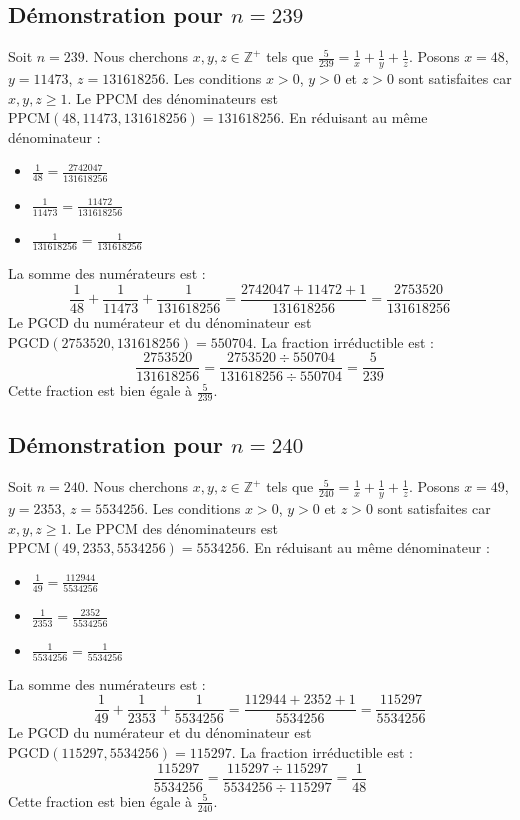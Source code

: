 \documentclass[11pt,a4paper]{article}
\begin{document}
\subsection{Démonstration pour $n = 239$}
Soit $n = 239$. Nous cherchons $x, y, z \in \mathbb{Z}^{+}$ tels que $\frac{5}{239} = \frac{1}{x} + \frac{1}{y} + \frac{1}{z}$.
Posons $x = 48$, $y = 11473$, $z = 131618256$.
Les conditions $x > 0$, $y > 0$ et $z > 0$ sont satisfaites car $x, y, z \geq 1$.
Le PPCM des dénominateurs est $\text{PPCM}(48, 11473, 131618256) = 131618256$.
En réduisant au même dénominateur :
\begin{itemize}
    \item $\frac{1}{48} = \frac{2742047}{131618256}$
    \item $\frac{1}{11473} = \frac{11472}{131618256}$
    \item $\frac{1}{131618256} = \frac{1}{131618256}$
\end{itemize}
La somme des numérateurs est :
$$ \frac{1}{48} + \frac{1}{11473} + \frac{1}{131618256} = \frac{2742047 + 11472 + 1}{131618256} = \frac{2753520}{131618256} $$
Le PGCD du numérateur et du dénominateur est $\text{PGCD}(2753520, 131618256) = 550704$.
La fraction irréductible est :
$$ \frac{2753520}{131618256} = \frac{2753520 \div 550704}{131618256 \div 550704} = \frac{5}{239} $$
Cette fraction est bien égale à $\frac{5}{239}$.

\subsection{Démonstration pour $n = 240$}
Soit $n = 240$. Nous cherchons $x, y, z \in \mathbb{Z}^{+}$ tels que $\frac{5}{240} = \frac{1}{x} + \frac{1}{y} + \frac{1}{z}$.
Posons $x = 49$, $y = 2353$, $z = 5534256$.
Les conditions $x > 0$, $y > 0$ et $z > 0$ sont satisfaites car $x, y, z \geq 1$.
Le PPCM des dénominateurs est $\text{PPCM}(49, 2353, 5534256) = 5534256$.
En réduisant au même dénominateur :
\begin{itemize}
    \item $\frac{1}{49} = \frac{112944}{5534256}$
    \item $\frac{1}{2353} = \frac{2352}{5534256}$
    \item $\frac{1}{5534256} = \frac{1}{5534256}$
\end{itemize}
La somme des numérateurs est :
$$ \frac{1}{49} + \frac{1}{2353} + \frac{1}{5534256} = \frac{112944 + 2352 + 1}{5534256} = \frac{115297}{5534256} $$
Le PGCD du numérateur et du dénominateur est $\text{PGCD}(115297, 5534256) = 115297$.
La fraction irréductible est :
$$ \frac{115297}{5534256} = \frac{115297 \div 115297}{5534256 \div 115297} = \frac{1}{48} $$
Cette fraction est bien égale à $\frac{5}{240}$.
\end{document}

